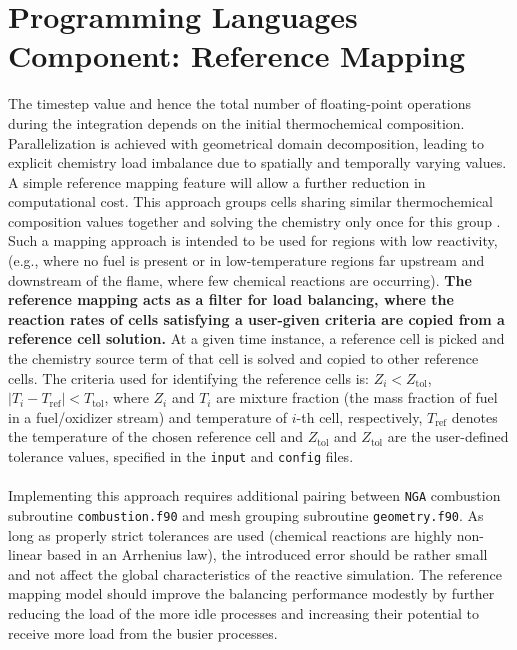 \documentclass{homework}
\begin{document}
\section{\textbf{Programming Languages Component: Reference Mapping}}
\noindent The timestep value and hence the total number of floating-point operations during the integration depends on the initial thermochemical composition. Parallelization is achieved with geometrical domain decomposition, leading to explicit chemistry load imbalance due to spatially and temporally varying values. A simple reference mapping feature will allow a further reduction in computational cost. This approach groups cells sharing similar thermochemical composition values together and solving the chemistry only once for this group \cite{DLBFoam_1}. Such a mapping approach is intended to be used for regions with low reactivity, (e.g., where no fuel is present or in low-temperature regions far upstream and downstream of the flame, where few chemical reactions are occurring). \textbf{The reference mapping acts as a filter for load balancing, where the reaction rates of cells satisfying a user-given criteria are copied from a reference cell solution.} At a given time instance, a reference cell is picked and the chemistry source term of that cell is solved and copied to other reference cells. The criteria used for identifying the reference cells is: $Z_i < Z_\textrm{tol}$, $|T_i - T_\textrm{ref} | < T_\textrm{tol}$, where $Z_i$ and $T_i$ are mixture fraction (the mass fraction of fuel in a fuel/oxidizer stream) and temperature of $i$-th cell, respectively, $T_\textrm{ref}$ denotes the temperature of the chosen reference cell and $Z_\textrm{tol}$ and $Z_\textrm{tol}$ are the user-defined tolerance values, specified in the \texttt{input} and \texttt{config} files. 
\\ \\ \noindent
Implementing this approach requires additional pairing between \texttt{NGA} combustion subroutine \texttt{combustion.f90} and mesh grouping subroutine \texttt{geometry.f90}. As long as properly strict tolerances are used (chemical reactions are highly non-linear based in an Arrhenius law), the introduced error should be rather small and not affect the global characteristics of the reactive simulation. The reference mapping model should improve the balancing performance modestly by further reducing the load of the more idle processes and increasing their potential to receive more load from the busier processes. 
\end{document}
